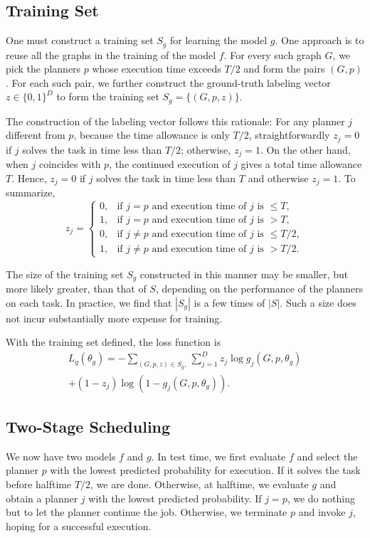 \documentclass[letterpaper]{article} %
\begin{document}
\subsection{Training Set}
One must construct a training set $S_g$ for learning the model $g$. One approach is to reuse all the graphs in the training of the model $f$. For every such graph $G$, we pick the planners $p$ whose execution time exceeds $T/2$ and form the pairs $(G,p)$. For each such pair, we further construct the ground-truth labeling vector $z\in\{0,1\}^D$ to form the training set $S_g=\{(G,p,z)\}$.

The construction of the labeling vector follows this rationale: For any planner $j$ different from $p$, because the time allowance is only $T/2$, straightforwardly $z_j=0$ if $j$ solves the task in time less than $T/2$; otherwise, $z_j=1$. On the other hand, when $j$ coincides with $p$, the continued execution of $j$ gives a total time allowance $T$. Hence, $z_j=0$ if $j$ solves the task in time less than $T$ and otherwise $z_j=1$. To summarize,
\[
z_j=
\begin{cases}
0, & \text{if $j=p$ and execution time of $j$ is $\le T$}, \\
1, & \text{if $j=p$ and execution time of $j$ is $>T$}, \\
0, & \text{if $j\ne p$ and execution time of $j$ is $\le T/2$}, \\
1, & \text{if $j\ne p$ and execution time of $j$ is $>T/2$}.
\end{cases}
\]

The size of the training set $S_g$ constructed in this manner may be smaller, but more likely greater, than that of $S$, depending on the performance of the planners on each task. In practice, we find that $|S_g|$ is a few times of $|S|$. Such a size does not incur substantially more expense for training.

With the training set defined, the loss function is
\begin{multline*}
L_g(\theta_g)=-\sum_{(G,p,z)\in S_g,}\sum_{j=1}^D z_j\log g_j(G,p,\theta_g)\\
+(1-z_j)\log (1-g_j(G,p,\theta_g)).
\end{multline*}


\subsection{Two-Stage Scheduling}
We now have two models $f$ and $g$. In test time, we first evaluate $f$ and select the planner $p$ with the lowest predicted probability for execution. If it solves the task before halftime $T/2$, we are done. Otherwise, at halftime, we evaluate $g$ and obtain a planner $j$ with the lowest predicted probability. If $j=p$, we do nothing but to let the planner continue the job. Otherwise, we terminate $p$ and invoke $j$, hoping for a successful execution.
\end{document}
